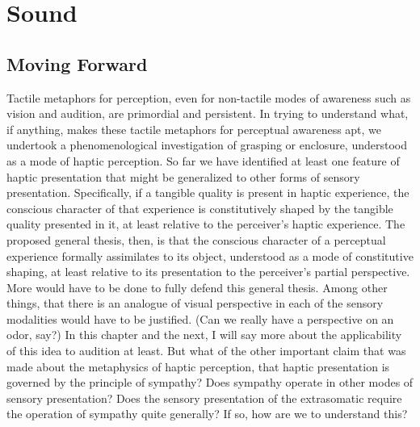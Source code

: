 \chapter{Sound} %
\label{cha:sound}

\section{Moving Forward} %
\label{sec:moving_forward}

Tactile metaphors for perception, even for non-tactile modes of awareness such as vision and audition, are primordial and persistent. In trying to understand what, if anything, makes these tactile metaphors for perceptual awareness apt, we undertook a phenomenological investigation of grasping or enclosure, understood as a mode of haptic perception. So far we have identified at least one feature of haptic presentation that might be generalized to other forms of sensory presentation. Specifically, if a tangible quality is present in haptic experience, the conscious character of that experience is constitutively shaped by the tangible quality presented in it, at least relative to the perceiver's haptic experience. The proposed general thesis, then, is that the conscious character of a perceptual experience formally assimilates to its object, understood as a mode of constitutive shaping, at least relative to its presentation to the perceiver's partial perspective. More would have to be done to fully defend this general thesis. Among other things, that there is an analogue of visual perspective in each of the sensory modalities would have to be justified. (Can we really have a perspective on an odor, say?) In this chapter and the next, I will say more about the applicability of this idea to audition at least. But what of the other important claim that was made about the metaphysics of haptic perception, that haptic presentation is governed by the principle of sympathy? Does sympathy operate in other modes of sensory presentation? Does the sensory presentation of the extrasomatic require the operation of sympathy quite generally? If so, how are we to understand this?

